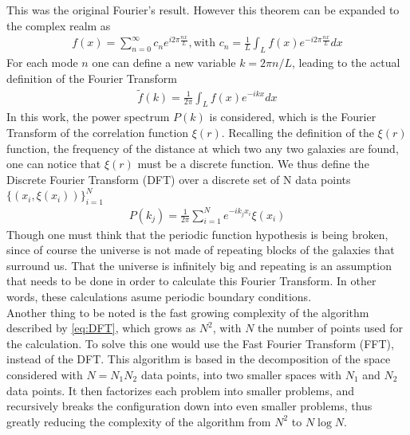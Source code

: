 This was the original Fourier's result. However this theorem can be expanded to the complex realm as 
\begin{align}
	f(x) = \sum_{n=0}^{\infty} c_n e^{i 2\pi \frac{nx}{L}}, \text{with } c_n = \frac{1}{L}\int_{L}^{} f(x) e^{-i 2\pi \frac{nx}{L}}dx 
\end{align}
For each mode $n$ one can define a new variable $k=2\pi n /L$, leading to the actual definition of the Fourier Transform 
\begin{align}
	\tilde{f}(k) = \frac{1}{2\pi}\int_{L}^{}  f(x) e^{-i k x} dx
\end{align}
In this work, the power spectrum $P(k)$ is considered, which is the Fourier Transform of the correlation function $\xi(r)$.  Recalling the definition of the $\xi(r)$ function, the frequency of the distance at which two any two galaxies are found, one can notice that  $\xi(r)$ must be a discrete function. We thus define the Discrete Fourier Transform (DFT) over a discrete set of N data points $\{\left( x_i, \xi(x_i) \right) \}_{i=1}^{N} $
\begin{align}
	P(k_j) = \frac{1}{2\pi}\sum_{i=1}^{N} e^{-i k_j x_{i}} \xi(x_i)
	\label{eq:DFT}
\end{align}
Though one must think that the periodic function hypothesis is being broken, since of course the universe is not made of repeating blocks of the galaxies that surround us. That the universe is infinitely big and repeating is an assumption that needs to be done in order to calculate this Fourier Transform. In other words, these calculations asume periodic boundary conditions.\\


Another thing to be noted is the fast growing complexity of the algorithm described by \eqref{eq:DFT}, which grows as $N^2$, with $N$ the number of points used for the calculation. 
To solve this one would use the Fast Fourier Transform (FFT), instead of the DFT. This algorithm is based in the decomposition of the space considered with $N=N_1N_2$ data points, into two smaller spaces with $N_1$ and $N_2$ data points. It then factorizes each problem into smaller problems, and recursively breaks the configuration down into even smaller problems, thus greatly reducing the complexity of the algorithm from $N^2$ to $N\log N$.  \\

